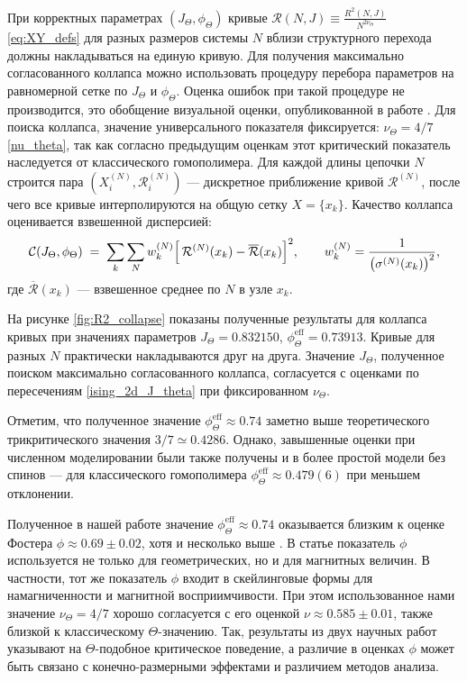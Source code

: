  
При корректных параметрах $(J_\Theta,\phi_\Theta)$ кривые $  \mathcal{R}(N, J)    \equiv \frac{R^2(N,J)}{N^{2\nu_\Theta}}$ \eqref{eq:XY_defs} для разных размеров системы $N$ вблизи структурного перехода должны накладываться на единую кривую.  
 Для получения максимально согласованного коллапса можно использовать процедуру перебора параметров на равномерной сетке по $J_\Theta$ и $\phi_\Theta$.  Оценка ошибок при такой процедуре не производится, это обобщение визуальной оценки, опубликованной в работе  \cite{faizullina2021critical1}. 
  Для поиска коллапса, значение универсального показателя фиксируется: $\nu_\Theta = 4/7$   \eqref{nu_theta}, так как согласно предыдущим оценкам этот критический показатель наследуется от классического гомополимера.  
Для каждой длины цепочки $N$ строится
пара $(X_i^{(N)},  \mathcal{R}_i^{(N)})$ --- дискретное приближение кривой $  \mathcal{R}^{(N)}$,
после чего все кривые интерполируются на общую сетку $X=\{x_k\}$.
Качество коллапса оценивается взвешенной дисперсией:
\begin{equation}
	\mathcal{C}(J_\Theta,\phi_\Theta)
	\;=\;
	\sum_{k}
	\sum_{N}
	w_k^{(N)}
	\Bigl[\,  \mathcal{R}^{(N)}(x_k) - \overline{  \mathcal{R}}(x_k)\Bigr]^2,
	\qquad
	w_k^{(N)} = \frac{1}{\bigl(\sigma^{(N)}(x_k)\bigr)^2},
	\label{eq:collapse_cost}
\end{equation}
где $\overline{  \mathcal{R}}(x_k)$ --- взвешенное среднее по $N$ в узле $x_k$.
 
 
 На рисунке \ref{fig:R2_collapse} показаны  полученные результаты для коллапса кривых при значениях параметров $J_\Theta=0.832150$, $\phi_\Theta^{\mathrm{eff}}=0.73913$. 
 Кривые для разных $N$ практически накладываются друг на друга. 
 Значение $J_\Theta$, полученное поиском максимально согласованного коллапса,  согласуется с оценками по пересечениям \eqref{ising_2d_J_theta} при фиксированном $\nu_\Theta$. 
 
 
 Отметим, что полученное значение $\phi_\Theta^{\mathrm{eff}}\approx 0.74$ заметно выше теоретического трикритического значения $3/7\simeq 0.4286$. Однако, завышенные оценки при численном моделировании были также получены и  в более простой модели без спинов --- для классического гомополимера $\phi_\Theta^{\mathrm{eff}}\approx 0.479(6)$  \cite{Caracciolo_2011} при меньшем отклонении. 
 
 
 Полученное в нашей работе значение $\phi_\Theta^{\mathrm{eff}}\approx 0.74$ оказывается близким к оценке Фостера $\phi \approx 0.69 \pm 0.02$, хотя и несколько выше \cite{PhysRevE.104.024122}. В статье \cite{PhysRevE.104.024122} показатель $\phi$ используется не только для геометрических, но и для магнитных величин. В частности, тот же показатель $\phi$ входит в скейлинговые формы для намагниченности и магнитной восприимчивости.
 При этом использованное нами значение $\nu_\Theta=4/7$ хорошо согласуется с его оценкой $\nu \approx 0.585 \pm 0.01$, также близкой к классическому $\Theta$-значению. 
 Так, результаты из двух научных работ указывают на $\Theta$-подобное критическое поведение, а различие в оценках $\phi$ может быть связано с конечно-размерными эффектами и различием методов анализа.
 

